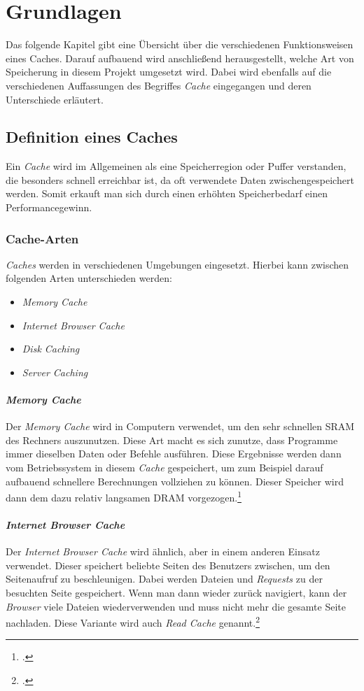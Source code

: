 \chapter{Grundlagen}
\label{cha:grundlagen}
Das folgende Kapitel gibt eine Übersicht über die verschiedenen Funktionsweisen eines Caches. Darauf aufbauend wird anschließend herausgestellt, welche Art von Speicherung in diesem Projekt umgesetzt wird. Dabei wird ebenfalls auf die verschiedenen Auffassungen des Begriffes \textit{Cache} eingegangen und deren Unterschiede erläutert.
\section{Definition eines Caches}
\label{sec:cache-definition}
Ein \textit{Cache} wird im Allgemeinen als eine Speicherregion oder Puffer verstanden, die besonders schnell erreichbar ist, da oft verwendete Daten zwischengespeichert werden. Somit erkauft man sich durch einen erhöhten Speicherbedarf einen Performancegewinn.
\subsection{Cache-Arten}
\textit{Caches} werden in verschiedenen Umgebungen eingesetzt. Hierbei kann zwischen folgenden Arten unterschieden werden:
\begin{itemize}
\item \textit{Memory Cache}
\item \textit{Internet Browser Cache}
\item \textit{Disk Caching}
\item \textit{Server Caching}
\end{itemize}
\subsubsection*{\textit{Memory Cache}}
Der \textit{Memory Cache} wird in Computern verwendet, um den sehr schnellen \ac{SRAM} des Rechners auszunutzen. Diese Art macht es sich zunutze, dass Programme immer dieselben Daten oder Befehle ausführen. Diese Ergebnisse werden dann vom Betriebssystem in diesem \textit{Cache} gespeichert, um zum Beispiel darauf aufbauend schnellere Berechnungen vollziehen zu können. Dieser Speicher wird dann dem dazu relativ langsamen \ac{DRAM} vorgezogen.\footcite[Vgl.][S.48f.]{Cache-GummerSommer}
\subsubsection*{\textit{Internet Browser Cache}}
Der \textit{Internet Browser Cache} wird ähnlich, aber in einem anderen Einsatz verwendet. Dieser speichert beliebte Seiten des Benutzers zwischen, um den Seitenaufruf zu beschleunigen. Dabei werden Dateien und \textit{Requests} zu der besuchten Seite gespeichert. Wenn man dann wieder zurück navigiert, kann der \textit{Browser} viele Dateien wiederverwenden und muss nicht mehr die gesamte Seite nachladen. Diese Variante wird auch \textit{Read Cache} genannt.\footcite{Cache-Techtarget}
